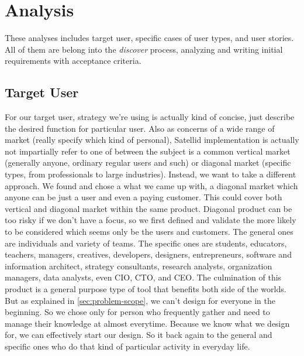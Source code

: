 \section{Analysis}
\label{sec:analysis}

These analyses includes target user, specific cases of user types, and user stories.
All of them are belong into the \textit{discover} process, analyzing and writing initial requirements with acceptance criteria.

\subsection{Target User}

For our target user, strategy we're using is actually kind of concise, just describe the desired function for particular user.
Also as concerns of a wide range of market (really specify which kind of personal), Satellid implementation is actually not impartially refer to one of between the subject is a common vertical market (generally anyone, ordinary regular users and such) or diagonal market (specific types, from professionals to large industries).
Instead, we want to take a different approach.
We found and chose a what we came up with, a diagonal market which anyone can be just a user and even a paying customer.
This could cover both vertical and diagonal market within the same product.
Diagonal product can be too risky if we don't have a focus, so we first defined and validate the more likely to be considered which seems only be the users and customers.
The general ones are individuals and variety of teams.
The specific ones are students, educators, teachers, managers, creatives, developers, designers, entrepreneurs, software and information architect, strategy consultants, research analysts, organization managers, data analysts, even \ac{CIO}, \ac{CTO}, and \ac{CEO}.
The culmination of this product is a general purpose type of tool that benefits both side of the worlds.
But as explained in \autoref{sec:problem-scope}, we can't design for everyone in the beginning.
So we chose only for person who frequently gather and need to manage their knowledge at almost everytime.
Because we know what we design for, we can effectively start our design.
So it back again to the general and specific ones who do that kind of particular activity in everyday life.

